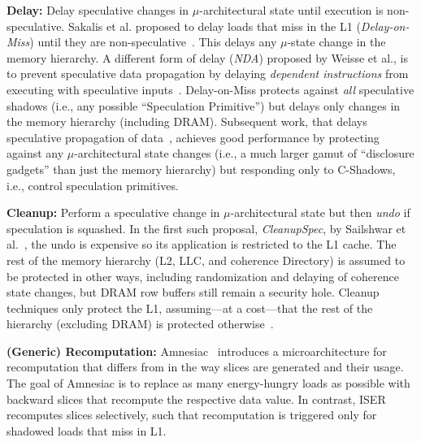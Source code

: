 \textbf{Delay:} Delay speculative changes in $\mu$-architectural state until execution is non-speculative. Sakalis et al. proposed to delay loads that miss in the L1 (\emph{Delay-on-Miss}) until they are non-speculative~\cite{sakalis+:ISCA2019vp}. This delays any $\mu$-state change in the memory hierarchy. A different form of delay (\emph{NDA}) proposed by Weisse et al., is to prevent speculative data propagation by delaying \emph{dependent instructions} from executing with speculative inputs~\cite{weisse2019nda, yu_speculative:MICRO2019-STT, fustos+:DAC2019spectreguard}. Delay-on-Miss protects against \emph{all} speculative shadows (i.e., any possible ``Speculation Primitive'') but delays only changes in the memory hierarchy (including DRAM). Subsequent work, that delays speculative propagation of data~\cite{weisse2019nda}, achieves good performance by protecting against any $\mu$-architectural state changes (i.e., a much larger gamut of ``disclosure gadgets'' than just the memory hierarchy) but responding only to C-Shadows, i.e., control speculation primitives.

\textbf{Cleanup:} Perform a speculative change in $\mu$-architectural state but then \emph{undo} if speculation is squashed. In the first such proposal, \emph{CleanupSpec}, by Sailshwar et al.~\cite{saileshwar2019cleanupspec}, the undo is expensive so its application is restricted to the L1 cache. The rest of the memory hierarchy (L2, LLC, and coherence Directory) is assumed to be protected in other ways, including randomization and delaying of coherence state changes, but DRAM row buffers still remain a security hole.
Cleanup techniques only protect the L1, assuming---at a cost---that the rest of the hierarchy (excluding DRAM) is protected otherwise~\cite{saileshwar2019cleanupspec}.


\textbf{(Generic) Recomputation:} Amnesiac~\cite{amnesiac17} introduces a microarchitecture for recomputation that differs from \arch{} in the way slices are generated and their usage.
The goal of Amnesiac is to replace as many energy-hungry loads as possible with backward slices that recompute the respective data value. %
In contrast, ISER recomputes slices selectively, such that recomputation is triggered only for shadowed loads that miss in L1.

